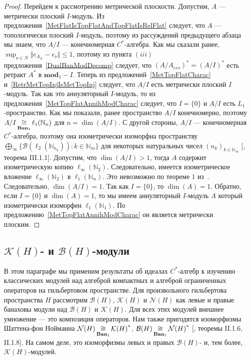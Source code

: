 \begin{proof}
Перейдем к рассмотрению метрической плоскости. Допустим, $A$ --- метрически
плоский $I$-модуль. Из предложения~\ref{MetFlatIsTopFlatAndTopFlatIsRelFlat}
следует, что $A$ --- топологически плоский $I$-модуль, поэтому из рассуждений
предыдущего абзаца мы знаем, что $A/I$ --- конечномерная $C^*$-алгебра. Как мы
сказали ранее, $\sup_{\nu\in N}\Vert e_{A_\#}-e_\nu\Vert\leq 1$, поэтому из
пункта $(iii)$ предложения~\ref{DualBanModDecomp} следует, что
${(A/A_{ess})}^*={(A/I)}^*$ есть ретракт $A^*$ в $\mathbf{mod}_1-I$. Теперь из
предложений~\ref{MetTopFlatCharac} и~\ref{RetrMetTopInjIsMetTopInj} следует, что
$A/I$ есть метрически плоский $I$-модуль. Так как это аннуляторный $I$-модуль,
то из предложения~\ref{MetTopFlatAnnihModCharac} следует, что $I= \{0 \}$ и
$A/I$ есть $L_1$-пространство. Как мы показали, ранее пространство $A/I$
конечномерно, поэтому $A/I\mathop{\mathbin{\cong}}\limits_{\mathbf{Ban}_1}\ell_1(\mathbb{N}_n)$ для
$n=\operatorname{dim}(A/I)$. С другой стороны, $A/I$ --- конечномерная
$C^*$-алгебра, поэтому она изометрически изоморфна пространству
$\bigoplus_\infty \{ \mathcal{B}(\ell_2(\mathbb{N}_{n_k})):k\in\mathbb{N}_m \}$
для некоторых натуральных чисел ${(n_k)}_{k\in\mathbb{N}_m}$
[\cite{DavCSatrAlgByExmpl}, теорема III.1.1]. Допустим, что
$\operatorname{dim}(A/I)>1$, тогда $A$ содержит изометрическую копию
$\ell_\infty(\mathbb{N}_2)$. Следовательно, имеется изометрическое вложение
$\ell_\infty(\mathbb{N}_2)$ в $\ell_1(\mathbb{N}_n)$. Это невозможно по теореме
$1$ из~\cite{LyubIsomEmdbFinDimLp}. Следовательно, $\operatorname{dim}(A/I)=1$.
Так как $I= \{0 \}$, то $\operatorname{dim}(A)=1$. Обратно, если $I= \{0 \}$ и
$\operatorname{dim}(A)=1$, то мы имеем аннуляторный $I$-модуль $A$ который
изометрически изоморфен $\ell_1(\mathbb{N}_1)$. По
предложению~\ref{MetTopFlatAnnihModCharac} он является метрически плоским. 
\end{proof}


\subsection{\texorpdfstring{$\mathcal{K}(H)$}{K (H)}- и
    \texorpdfstring{$\mathcal{B}(H)$}{B (H)}-модули}\label{
        SubSectionKHAndBHModules}

В этом параграфе мы применим результаты об идеалах $C^*$-алгебр к изучению
классических модулей над алгеброй компактных и алгеброй ограниченных операторов
на гильбертовом пространстве. Для произвольного гильбертова пространства $H$
рассмотрим $\mathcal{B}(H)$, $\mathcal{K}(H)$ и $\mathcal{N}(H)$ как левые и
правые банаховы модули над $\mathcal{B}(H)$ и $\mathcal{K}(H)$. Для всех этих
модулей внешнее умножение --- это композиция операторов. Нам также пригодятся
изоморфизмы Шаттена-фон Нойманна
$\mathcal{N}(H)\mathop{\mathbin{\cong}}\limits_{\mathbf{Ban}_1}{\mathcal{K}(H)}^*$,
$\mathcal{B}(H)\mathop{\mathbin{\cong}}\limits_{\mathbf{Ban}_1}{\mathcal{N}(H)}^*$ [\cite{TakThOpAlgVol1},
теоремы II.1.6, II.1.8]. На самом деле, это изоморфизмы левых и правых
$\mathcal{B}(H)$- и, тем более, $\mathcal{K}(H)$-модулей.

